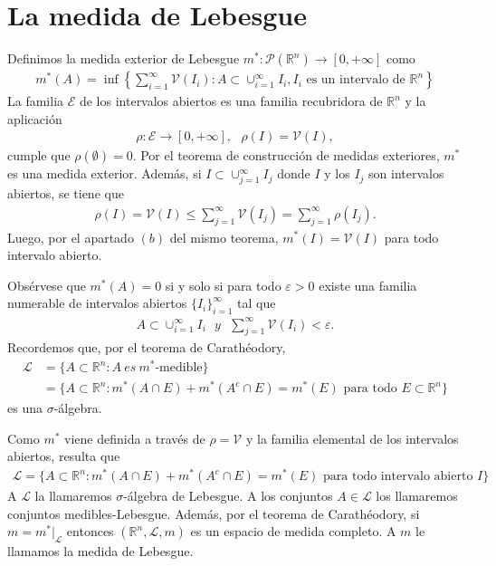 \section{La medida de Lebesgue}

Definimos la medida exterior de Lebesgue $m^*: \mathcal{P}(\mathbb{R}^n) \longrightarrow [0,+\infty]$ como
\begin{align*}
    m^*(A) = \inf \left\{ \sum_{i=1}^{\infty}{\mathcal{V}(I_i)} : A \subset \cup_{i=1}^{\infty}{I_i}, I_i \text{ es un intervalo de } \mathbb{R}^n\right\}
\end{align*}
La familia $\mathcal{E}$ de los intervalos abiertos es una familia recubridora de $\mathbb{R}^n$ y la aplicación
\begin{align*}
    \rho : \mathcal{E} \longrightarrow [0,+\infty], \ \ \ \rho(I) = \mathcal{V}(I),
\end{align*}
cumple que $\rho(\emptyset) = 0$. Por el teorema de construcción de medidas exteriores, $m^*$ es una medida exterior. Además, si $I \subset \cup_{j=1}^{\infty}{I_j}$ donde $I$ y los $I_j$ son intervalos abiertos, se tiene que
\begin{align*}
    \rho(I) = \mathcal{V}(I) \leq \sum_{j=1}^{\infty}{\mathcal{V}(I_j)} = \sum_{j=1}^{\infty}{\rho(I_j)}.
\end{align*}
Luego, por el apartado $(b)$ del mismo teorema, $m^*(I) = \mathcal{V}(I)$ para todo intervalo abierto.

Obsérvese que $m^*(A) = 0$ si y solo si para todo $\varepsilon > 0$ existe una familia numerable de intervalos abiertos $\{I_i\}_{i=1}^{\infty}$ tal que
\begin{align*}
    A \subset \cup_{i=1}^{\infty}{I_i} \ \ \ y \ \ \ \sum_{j=1}^{\infty}{\mathcal{V}(I_i)} < \varepsilon.
\end{align*}
Recordemos que, por el teorema de Carathéodory,
\begin{align*}
    \mathcal{L} & = \{A \subset \mathbb{R}^n : A \ es \ m^* \text{-medible} \}                                                       \\
                & = \{A \subset \mathbb{R}^n : m^*(A \cap E) + m^*(A^c \cap E) = m^*(E) \text{ para todo } E \subset \mathbb{R}^n \}
\end{align*}
es una $\sigma$-álgebra.

Como $m^*$ viene definida a través de $\rho = \mathcal{V}$ y la familia elemental de los intervalos abiertos, resulta que
\begin{align*}
    \mathcal{L} = \{A \subset \mathbb{R}^n : m^*(A \cap E) + m^*(A^c \cap E) = m^*(E) \text{ para todo intervalo abierto } I\}
\end{align*}
A $\mathcal{L}$ la llamaremos $\sigma$-álgebra de Lebesgue. A los conjuntos $A \in \mathcal{L}$ los llamaremos conjuntos medibles-Lebesgue. Además, por el teorema de Carathéodory, si $m = m^*|_{\mathcal{L}}$ entonces $(\mathbb{R}^n, \mathcal{L}, m)$ es un espacio de medida completo. A $m$ le llamamos la medida de Lebesgue.

